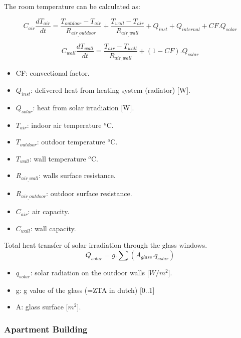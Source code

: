 \documentclass[a4paper,10pt]{article}
\begin{document}
The room temperature can be calculated as:

\begin{equation}
C_{air}\frac{dT_{air}}{dt}=\frac{T_{outdoor}-T_{air}}{R_{air_{\_}outdoor}} + \frac{T_{wall}-T_{air}}{R_{air_{\_}wall}} + Q_{inst} + Q_{internal} + CF.Q_{solar}
\end{equation}

\begin{equation}
C_{wall}\frac{dT_{wall}}{dt}=\frac{T_{air}-T_{wall}}{R_{air_{\_}wall}} + (1-CF).Q_{solar}
\end{equation}

 \begin{itemize}
      \item CF: convectional factor.
      \item $Q_{inst}$: delivered heat from heating system (radiator) [W].
      \item $Q_{solar}$: heat from solar irradiation [W].
      \item $T_{air}$: indoor air temperature $^o$C.
      \item $T_{outdoor}$: outdoor temperature $^o$C.
      \item $T_{wall}$: wall temperature $^o$C.
      \item $R_{air_{\_}wall}$: walls surface resistance.
      \item $R_{air_{\_}outdoor}$: outdoor surface resistance.
      \item $C_{air}$: air capacity.
      \item $C_{wall}$: wall capacity.
    \end{itemize}
    

Total heat transfer of solar irradiation through the glass windows. 
\begin{equation}
Q_{solar}=g.\sum(A_{glass}.q_{solar})
\end{equation}

\begin{itemize}
    \item $q_{solar}$: solar radiation on the outdoor walls [$W/m^2$]. 
    \item g: g value of the glass (=ZTA in dutch) [0..1]
    \item A: glass surface [$m^2$].
\end{itemize}

\subsubsection{Apartment Building}
\end{document}
